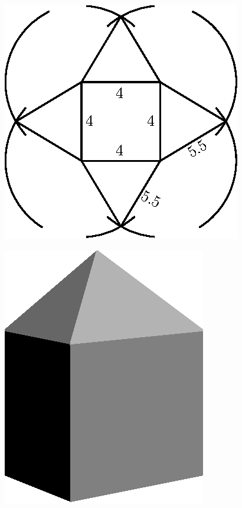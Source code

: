 \begin{minipage}[b]{5cm}
\begin{figure}[H]
\centering
\includegraphics[scale=.9]{figure/fig_14.eps}
\caption{}\label{chap6-fig14}
\end{figure}
\end{minipage}
\quad
\begin{minipage}[b]{5cm}
\begin{figure}[H]
\centering
\includegraphics[scale=.9]{figure/fig_15.eps}
\caption{}\label{chap6-fig15}
\end{figure}
\end{minipage}

